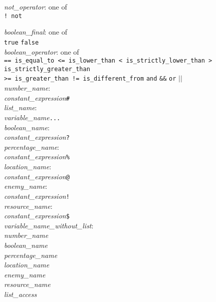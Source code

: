\documentclass[a4paper]{article}
\begin{document}
\noindent\textit{not\_operator}: one of\\
\indent \texttt{! not}

\noindent\textit{boolean\_final}: one of\\
\indent \texttt{true} \texttt{false}\\

\noindent\textit{boolean\_operator}: one of \\
\indent \texttt{== is\_equal\_to <= is\_lower\_than < is\_strictly\_lower\_than > is\_strictly\_greater\_than\\
\indent >= is\_greater\_than != is\_different\_from} \texttt{and} \texttt{\&\&} \texttt{or} \texttt{$\vert\vert$}\\

\noindent\textit{number\_name}:\\
\indent\textit{constant\_expression}\texttt{\#}\\

\noindent\textit{list\_name}:\\
\indent\textit{variable\_name}\texttt{...}\\

\noindent\textit{boolean\_name}:\\
\indent\textit{constant\_expression}\texttt{?}\\

\noindent\textit{percentage\_name}:\\
\indent\textit{constant\_expression}\texttt{\%}\\

\noindent\textit{location\_name}:\\
\indent\textit{constant\_expression}\texttt{@}\\

\noindent\textit{enemy\_name}:\\
\indent\textit{constant\_expression}\texttt{!}\\

\noindent\textit{resource\_name}:\\
\indent\textit{constant\_expression}\texttt{\$}\\

\noindent\textit{variable\_name\_without\_list}:\\
\indent\textit{number\_name}\\
\indent\textit{boolean\_name}\\
\indent\textit{percentage\_name}\\
\indent\textit{location\_name}\\
\indent\textit{enemy\_name}\\
\indent\textit{resource\_name}\\
\indent\textit{list\_access}\\
\end{document}
